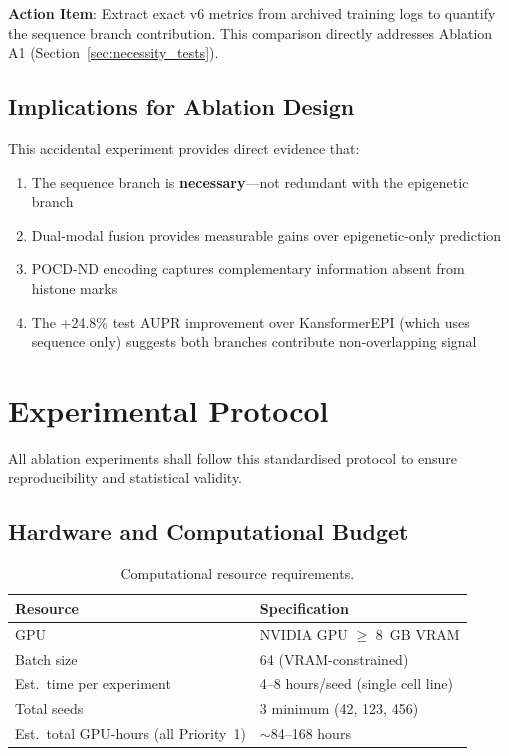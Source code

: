 \documentclass[11pt,a4paper]{article}
\begin{document}
\textbf{Action Item}: Extract exact v6 metrics from archived training logs to quantify the sequence branch contribution. This comparison directly addresses Ablation A1 (Section~\ref{sec:necessity_tests}).

\subsection{Implications for Ablation Design}

This accidental experiment provides direct evidence that:
\begin{enumerate}
    \item The sequence branch is \textbf{necessary}---not redundant with the epigenetic branch
    \item Dual-modal fusion provides measurable gains over epigenetic-only prediction
    \item POCD-ND encoding captures complementary information absent from histone marks
    \item The +24.8\% test AUPR improvement over KansformerEPI (which uses sequence only) suggests both branches contribute non-overlapping signal
\end{enumerate}

\section{Experimental Protocol}
\label{sec:protocol}

All ablation experiments shall follow this standardised protocol to ensure reproducibility and statistical validity.

\subsection{Hardware and Computational Budget}

\begin{table}[H]
\centering
\begin{tabular}{ll}
\toprule
\textbf{Resource} & \textbf{Specification} \\
\midrule
GPU & NVIDIA GPU $\geq$ 8~GB VRAM \\
Batch size & 64 (VRAM-constrained) \\
Est.\ time per experiment & 4--8 hours/seed (single cell line) \\
Total seeds & 3 minimum (42, 123, 456) \\
Est.\ total GPU-hours (all Priority~1) & $\sim$84--168 hours \\
\bottomrule
\end{tabular}
\caption{Computational resource requirements.}
\end{table}
\end{document}

